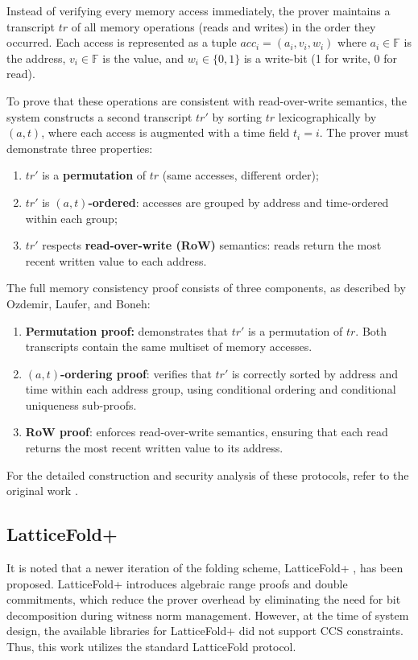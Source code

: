 Instead of verifying every memory access immediately, the prover maintains a
transcript $tr$ of all memory operations (reads and writes) in the order they
occurred. Each access is represented as a tuple $acc_i = (a_i, v_i, w_i)$ where
$a_i \in \mathbb{F}$ is the address, $v_i \in \mathbb{F}$ is the value, and $w_i \in \{0,1\}$
is a write-bit (1 for write, 0 for read).

To prove that these operations are consistent with read-over-write semantics,
the system constructs a second transcript $tr'$ by sorting $tr$ lexicographically
by $(a, t)$, where each access is augmented with a time field $t_i = i$.
The prover must demonstrate three properties:
\begin{enumerate}
	\item $tr'$ is a \textbf{permutation} of $tr$ (same accesses, different order);
	\item $tr'$ is \textbf{$(a, t)$-ordered}: accesses are grouped by address and
	      time-ordered within each group;
	\item $tr'$ respects \textbf{read-over-write (RoW)} semantics: reads return the
	      most recent written value to each address.
\end{enumerate}

The full memory consistency proof consists of three components, as described
by Ozdemir, Laufer, and Boneh:

\begin{enumerate}
	\item \textbf{Permutation proof:} demonstrates that $tr'$ is a permutation of
	      $tr$. Both transcripts contain the same multiset of memory
	      accesses.

	\item \textbf{$(a, t)$-ordering proof}: verifies that $tr'$ is correctly sorted
	      by address and time within each address group, using conditional ordering
	      and conditional uniqueness sub-proofs.

	\item \textbf{RoW proof}: enforces read-over-write semantics, ensuring
	      that each read returns the most recent written value to its address.
\end{enumerate}

For the detailed construction and security analysis of these protocols, refer
to the original work \cite{MemoryAccessInSnarks}.

\subsection{LatticeFold+}

It is noted that a newer iteration of the folding scheme, LatticeFold+
\cite{LatticeFoldPlus}, has been proposed. LatticeFold+ introduces
algebraic range proofs and double commitments, which reduce the prover
overhead by eliminating the need for bit decomposition during witness norm
management. However, at the time of system design, the available libraries for
LatticeFold+ did not support CCS constraints. Thus, this work utilizes the
standard LatticeFold protocol.
